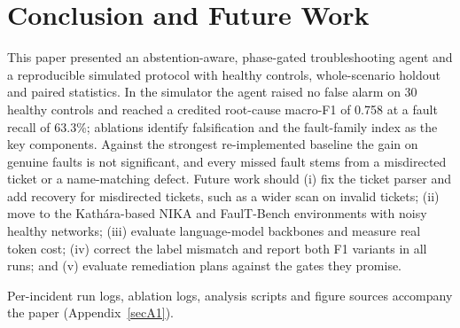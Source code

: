 \documentclass[pdflatex,sn-basic,Numbered,iicol]{sn-jnl}
\begin{document}
\section{Conclusion and Future Work}\label{sec:conclusion}
This paper presented an abstention-aware, phase-gated troubleshooting agent and a reproducible simulated protocol with healthy controls, whole-scenario holdout and paired statistics. In the simulator the agent raised no false alarm on 30 healthy controls and reached a credited root-cause macro-F1 of 0.758 at a fault recall of 63.3\%; ablations identify falsification and the fault-family index as the key components. Against the strongest re-implemented baseline the gain on genuine faults is not significant, and every missed fault stems from a misdirected ticket or a name-matching defect. Future work should (i) fix the ticket parser and add recovery for misdirected tickets, such as a wider scan on invalid tickets; (ii) move to the Kath\'ara-based NIKA and FaulT-Bench environments with noisy healthy networks; (iii) evaluate language-model backbones and measure real token cost; (iv) correct the label mismatch and report both F1 variants in all runs; and (v) evaluate remediation plans against the gates they promise.

\backmatter

Per-incident run logs, ablation logs, analysis scripts and figure sources accompany the paper (Appendix~\ref{secA1}).
\end{document}
